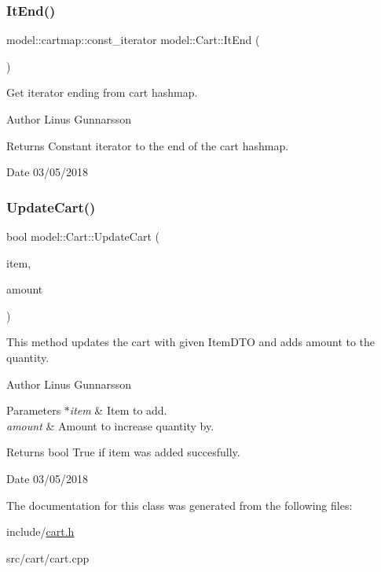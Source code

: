 \subsubsection{\texorpdfstring{It\+End()}{ItEnd()}}
{\footnotesize\ttfamily model\+::cartmap\+::const\+\_\+iterator model\+::\+Cart\+::\+It\+End (\begin{DoxyParamCaption}{ }\end{DoxyParamCaption})}

Get iterator ending from cart hashmap. \begin{DoxyAuthor}{Author}
Linus Gunnarsson 
\end{DoxyAuthor}
\begin{DoxyReturn}{Returns}
Constant iterator to the end of the cart hashmap. 
\end{DoxyReturn}
\begin{DoxyDate}{Date}
03/05/2018 
\end{DoxyDate}
\mbox{\label{classmodel_1_1Cart_a34a29b08e5d925fdb9ad9c4b4685c7c3}} 
\subsubsection{\texorpdfstring{Update\+Cart()}{UpdateCart()}}
{\footnotesize\ttfamily bool model\+::\+Cart\+::\+Update\+Cart (\begin{DoxyParamCaption}\item[{const \mbox{\hyperlink{classdb_1_1ItemDTO}{db\+::\+Item\+D\+TO}} $\ast$}]{item,  }\item[{unsigned short}]{amount }\end{DoxyParamCaption})}

This method updates the cart with given Item\+D\+TO and adds amount to the quantity. \begin{DoxyAuthor}{Author}
Linus Gunnarsson 
\end{DoxyAuthor}

\begin{DoxyParams}{Parameters}
{\em $\ast$item} & Item to add. \\
\hline
{\em amount} & Amount to increase quantity by. \\
\hline
\end{DoxyParams}
\begin{DoxyReturn}{Returns}
bool True if item was added succesfully. 
\end{DoxyReturn}
\begin{DoxyDate}{Date}
03/05/2018 
\end{DoxyDate}


The documentation for this class was generated from the following files\+:\begin{DoxyCompactItemize}
\item 
include/\mbox{\hyperlink{cart_8h}{cart.\+h}}\item 
src/cart/cart.\+cpp\end{DoxyCompactItemize}
